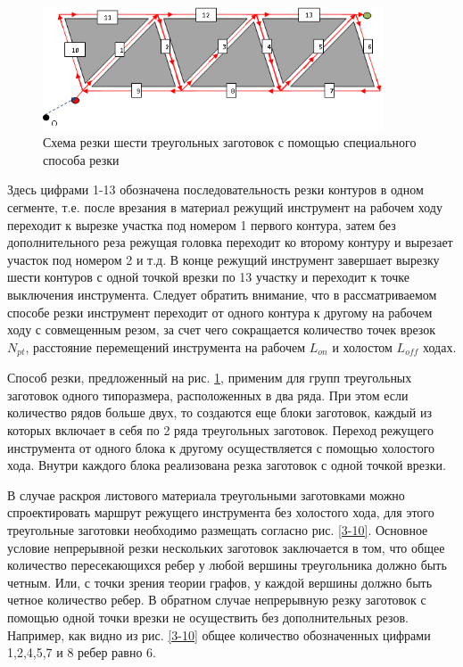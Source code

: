 \documentclass[12pt]{report}
\begin{document}
\begin{figure}
  \begin{center}
  \includegraphics[width=0.9\textwidth]{6-1.png}
  \caption{Схема резки шести треугольных заготовок с помощью специального способа резки}
  \label{6-1}
  \end{center}
\end{figure}

Здесь цифрами 1-13 обозначена последовательность
резки контуров в одном сегменте,
т.е. после врезания в материал режущий инструмент
на рабочем ходу переходит к вырезке участка под номером 1
первого контура,
затем без дополнительного реза режущая головка
переходит ко второму контуру и вырезает участок под номером 2 и т.д.
В конце режущий инструмент завершает вырезку шести контуров
с одной точкой врезки по 13 участку и переходит к
точке выключения инструмента.
Следует обратить внимание, что в рассматриваемом способе
резки инструмент переходит от одного контура к другому
на рабочем ходу с совмещенным резом,
за счет чего сокращается количество точек врезок $N_{pt}$,
расстояние перемещений инструмента на рабочем $L_{on}$
и холостом  $L_{off}$ ходах.

Способ резки, предложенный на рис. \ref{6-1},
применим для групп треугольных заготовок одного типоразмера,
расположенных в два ряда.
При этом если количество рядов больше двух,
то создаются еще блоки заготовок,
каждый из которых включает в себя по 2 ряда треугольных заготовок.
Переход режущего инструмента от одного блока к другому
осуществляется с помощью холостого хода.
Внутри каждого блока реализована резка заготовок с одной точкой врезки.

В случае раскроя листового материала треугольными
заготовками можно спроектировать маршрут режущего
инструмента без холостого хода,
для этого треугольные заготовки необходимо
размещать согласно рис. \ref{3-10}.
Основное условие непрерывной резки нескольких
заготовок заключается в том,
что общее количество пересекающихся ребер у
любой вершины треугольника должно быть четным.
Или, с точки зрения теории графов,
у каждой вершины
должно быть четное количество ребер.
В обратном случае непрерывную резку заготовок
с помощью одной точки врезки не осуществить
без дополнительных резов.
Например, как видно из рис. \ref{3-10}
общее количество обозначенных цифрами 1,2,4,5,7 и 8 ребер равно 6.
\end{document}
